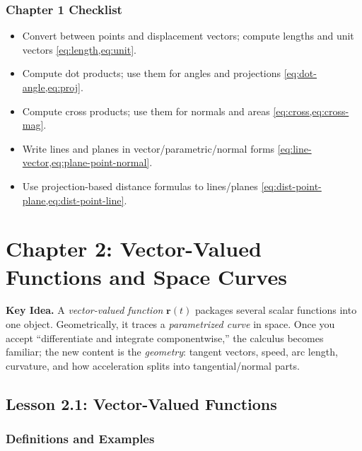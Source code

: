 \documentclass[12pt]{article}
\numberwithin{equation}{section}
\newcommand{\vect}[1]{\boldsymbol{#1}}   %
\theoremstyle{plain}
\theoremstyle{definition}
\theoremstyle{remark}
\newenvironment{keyidea}{\begin{tcolorbox}\textbf{Key Idea.}}{\end{tcolorbox}}
\begin{document}
\subsubsection*{Chapter 1 Checklist}
\begin{itemize}
\item Convert between points and displacement vectors; compute lengths and unit vectors \cref{eq:length,eq:unit}.
\item Compute dot products; use them for angles and projections \cref{eq:dot-angle,eq:proj}.
\item Compute cross products; use them for normals and areas \cref{eq:cross,eq:cross-mag}.
\item Write lines and planes in vector/parametric/normal forms \cref{eq:line-vector,eq:plane-point-normal}.
\item Use projection-based distance formulas to lines/planes \cref{eq:dist-point-plane,eq:dist-point-line}.
\end{itemize}



\section{Chapter 2: Vector-Valued Functions and Space Curves}

\begin{keyidea}
A \emph{vector-valued function} $\vect r(t)$ packages several scalar functions into one object. Geometrically, it traces a \emph{parametrized curve} in space. Once you accept “differentiate and integrate componentwise,” the calculus becomes familiar; the new content is the \emph{geometry}: tangent vectors, speed, arc length, curvature, and how acceleration splits into tangential/normal parts.
\end{keyidea}

\subsection{Lesson 2.1: Vector-Valued Functions}

\subsubsection{Definitions and Examples}
\end{document}
